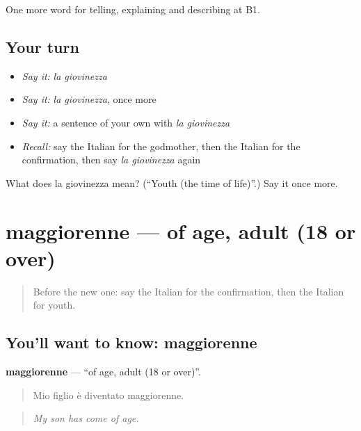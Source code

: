 \begin{grammarlens}[title={What you've built}]
One more word for telling, explaining and describing at B1.
\end{grammarlens}

\subsection*{Your turn}
\begin{itemize}
\raggedright
  \item \emph{Say it:} \emph{la giovinezza}
  \item \emph{Say it:} \emph{la giovinezza}, once more
  \item \emph{Say it:} a sentence of your own with \emph{la giovinezza}
  \item \emph{Recall:} say the Italian for the godmother, then the Italian for the confirmation, then say \emph{la giovinezza} again
\end{itemize}

\begin{tcolorbox}[breakable,colback=teal!4,colframe=teal!35!black,title={Before you move on}]
What does la giovinezza mean? (\textquotedblleft{}Youth (the time of life)\textquotedblright{}.) Say it once more.
\end{tcolorbox}
\section[maggiorenne]{maggiorenne — of age, adult (18 or over)}

\label{lesson:IT-C309-maggiorenne}



\begin{quote}
Before the new one: say the Italian for the confirmation, then the Italian for youth.
\end{quote}

\subsection*{You'll want to know: maggiorenne}
\textbf{maggiorenne} — \textquotedblleft{}of age, adult (18 or over)\textquotedblright{}.

\begin{quote}
Mio figlio è diventato maggiorenne.
\end{quote}

\begin{quote}
\emph{My son has come of age.}
\end{quote}

